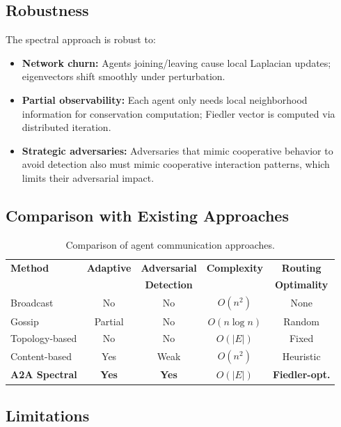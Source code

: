 \documentclass[11pt,a4paper]{article}
\begin{document}
\subsection{Robustness}

The spectral approach is robust to:
\begin{itemize}
  \item \textbf{Network churn:} Agents joining/leaving cause local Laplacian
        updates; eigenvectors shift smoothly under perturbation.
  \item \textbf{Partial observability:} Each agent only needs local neighborhood
        information for conservation computation; Fiedler vector is computed
        via distributed iteration.
  \item \textbf{Strategic adversaries:} Adversaries that mimic cooperative
        behavior to avoid detection also must mimic cooperative interaction
        patterns, which limits their adversarial impact.
\end{itemize}

\subsection{Comparison with Existing Approaches}

\begin{table}[ht]
\centering
\caption{Comparison of agent communication approaches.}
\begin{tabular}{@{}lcccc@{}}
\toprule
\textbf{Method} & \textbf{Adaptive} & \textbf{Adversarial} & \textbf{Complexity} & \textbf{Routing} \\
 & & \textbf{Detection} & & \textbf{Optimality} \\
\midrule
Broadcast & No & No & $O(n^2)$ & None \\
Gossip & Partial & No & $O(n \log n)$ & Random \\
Topology-based & No & No & $O(|E|)$ & Fixed \\
Content-based & Yes & Weak & $O(n^2)$ & Heuristic \\
\textbf{A2A Spectral} & \textbf{Yes} & \textbf{Yes} & $O(|E|)$ & \textbf{Fiedler-opt.} \\
\bottomrule
\end{tabular}
\end{table}

\subsection{Limitations}
\end{document}
